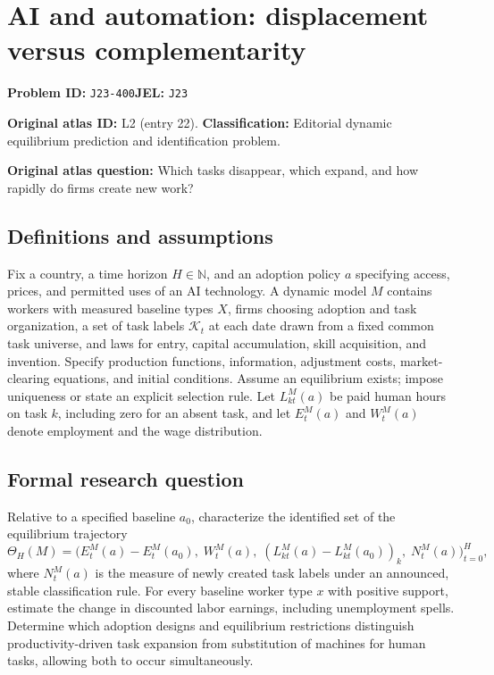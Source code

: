 \documentclass[11pt,a4paper]{article}
\begin{document}
\section*{AI and automation: displacement versus complementarity}
\textbf{Problem ID:} \texttt{J23-400}\quad \textbf{JEL:} \texttt{J23}\par
\label{problem:OP-0022}
\label{atlas:prob:L2}
\noindent\textbf{Original atlas ID:} L2 (entry 22). \textbf{Classification:} Editorial dynamic equilibrium prediction and identification problem.

\noindent\textbf{Original atlas question:} Which tasks disappear, which expand, and how rapidly do firms create new work?

\subsection*{Definitions and assumptions}
Fix a country, a time horizon $H\in\mathbb N$, and an adoption policy $a$ specifying access, prices, and permitted uses of an AI technology. A dynamic model $M$ contains workers with measured baseline types $X$, firms choosing adoption and task organization, a set of task labels $\mathcal K_t$ at each date drawn from a fixed common task universe, and laws for entry, capital accumulation, skill acquisition, and invention. Specify production functions, information, adjustment costs, market-clearing equations, and initial conditions. Assume an equilibrium exists; impose uniqueness or state an explicit selection rule. Let $L_{kt}^M(a)$ be paid human hours on task $k$, including zero for an absent task, and let $E_t^M(a)$ and $W_t^M(a)$ denote employment and the wage distribution.
\subsection*{Formal research question}
Relative to a specified baseline $a_0$, characterize the identified set of the equilibrium trajectory
\[
 \Theta_H(M)=\bigl(
 E_t^M(a)-E_t^M(a_0),\;
 W_t^M(a),\;
 (L_{kt}^M(a)-L_{kt}^M(a_0))_k,\;
 N_t^M(a)\bigr)_{t=0}^H,
\]
where $N_t^M(a)$ is the measure of newly created task labels under an announced, stable classification rule. For every baseline worker type $x$ with positive support, estimate the change in discounted labor earnings, including unemployment spells. Determine which adoption designs and equilibrium restrictions distinguish productivity-driven task expansion from substitution of machines for human tasks, allowing both to occur simultaneously.
\end{document}
